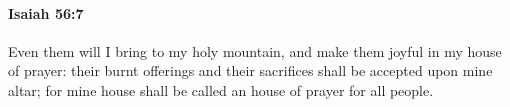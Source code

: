 
		\paragraph{Isaiah 56:7} %
			\label{ISAIAH-56-7}

			Even them will I bring to my holy mountain, and make them joyful in my house of prayer: their burnt offerings and their sacrifices shall be accepted upon mine altar; for mine house shall be called an house of prayer for all people.



